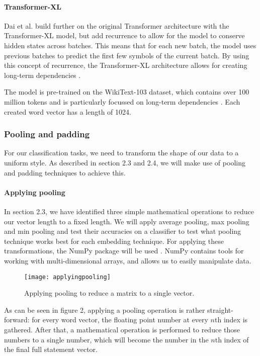 \paragraph{Transformer-XL}
Dai et al. build further on the original Transformer architecture with the Transformer-XL model, but add recurrence to allow for the model to conserve hidden states across batches.
This means that for each new batch, the model uses previous batches to predict the first few symbols of the current batch.
By using this concept of recurrence, the Transformer-XL architecture allows for creating long-term dependencies \cite{dai2019}. 

The model is pre-trained on the WikiText-103 dataset, which contains over 100 million tokens and is particularly focussed on long-term dependencies \cite{merity2017}. 
Each created word vector has a length of 1024. 

\subsubsection{Pooling and padding}
For our classification tasks, we need to transform the shape of our data to a uniform style.
As described in section 2.3 and 2.4, we will make use of pooling and padding techniques to achieve this.

\paragraph{Applying pooling}
In section 2.3, we have identified three simple mathematical operations to reduce our vector length to a fixed length.
We will apply average pooling, max pooling and min pooling and test their accuracies on a classifier to test what pooling technique works best for each embedding technique.
For applying these transformations, the NumPy package will be used \cite{numpy}.
NumPy contains tools for working with multi-dimensional arrays, and allows us to easily manipulate data. 

\begin{figure}[h]
    \centering
    \texttt{[image: applyingpooling]}
    \caption{Applying pooling to reduce a matrix to a single vector.}
\end{figure}

As can be seen in figure 2, applying a pooling operation is rather straight-forward: for every word vector, the floating point number at every $n$th index is gathered.
After that, a mathematical operation is performed to reduce those numbers to a single number, which will become the number in the $n$th index of the final full statement vector.

